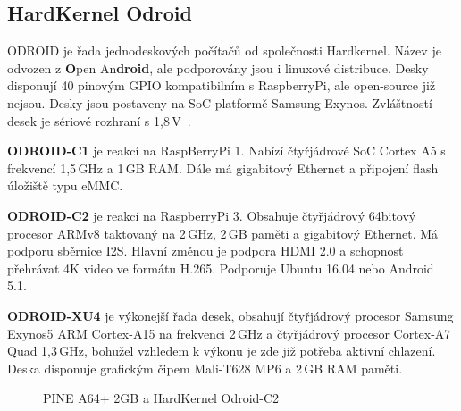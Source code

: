 \subsection{HardKernel Odroid}
	\label{KapKernel}
ODROID je řada jednodeskových počítačů od společnosti Hardkernel. Název je odvozen z \textbf{O}pen An\textbf{droid}, ale podporovány jsou i linuxové distribuce. Desky disponují 40 pinovým GPIO kompatibilním s RaspberryPi, ale open-source již nejsou. Desky jsou postaveny na SoC platformě Samsung Exynos. Zvláštností desek je sériové rozhraní s 1,8\,V~\cite{HardKernel}.
	
	\textbf{ODROID-C1} je reakcí na RaspBerryPi 1. Nabízí čtyřjádrové SoC Cortex A5 s frekvencí 1,5\,GHz a 1\,GB RAM. Dále má gigabitový Ethernet a připojení flash úložiště typu eMMC. 

	\textbf{ODROID-C2} je reakcí na RaspberryPi 3. Obsahuje čtyřjádrový 64bitový procesor ARMv8 taktovaný na 2\,GHz, 2\,GB paměti a gigabitový Ethernet. Má podporu sběrnice I2S. Hlavní změnou je podpora HDMI 2.0 a schopnost přehrávat 4K video ve formátu H.265. Podporuje Ubuntu 16.04 nebo Android 5.1. 
	
	\textbf{ODROID-XU4} je výkonejší řada desek, obsahují čtyřjádrový procesor Samsung Exynos5 ARM Cortex-A15 na frekvenci 2\,GHz a čtyřjádrový procesor Cortex-A7 Quad 1,3\,GHz, bohužel vzhledem k výkonu je zde již potřeba aktivní chlazení. Deska disponuje grafickým čipem Mali-T628 MP6 a 2\,GB RAM paměti.

	\begin{figure}[!ht]
	\vspace{-10pt}
    \centering
			\hspace*{5mm}
			\caption{PINE A64+ 2GB a HardKernel Odroid-C2}
			\vspace{-10pt}
\end{figure}
	
